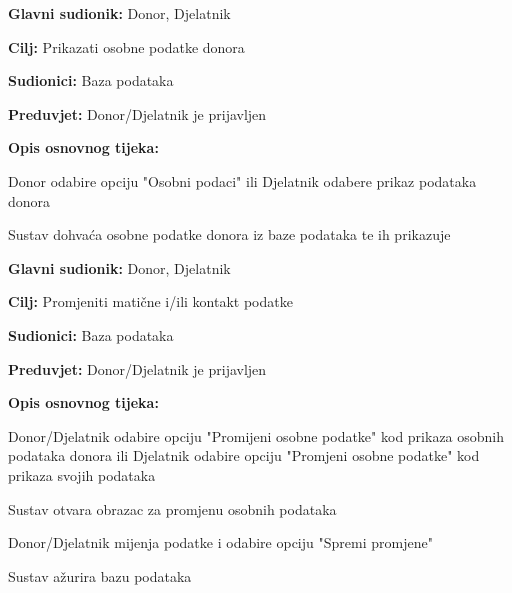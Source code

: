 \noindent {}
					\begin{packed_item}
	
						\item \textbf{Glavni sudionik: }Donor, Djelatnik
						\item \textbf{Cilj:} Prikazati osobne podatke donora
						\item \textbf{Sudionici:} Baza podataka
						\item \textbf{Preduvjet:} Donor/Djelatnik je prijavljen
						\item \textbf{Opis osnovnog tijeka:}
						
						\item[] \begin{packed_enum}
	
							\item Donor odabire opciju "Osobni podaci" ili Djelatnik odabere prikaz podataka donora
							\item Sustav dohvaća osobne podatke donora iz baze podataka te ih prikazuje
							
						\end{packed_enum}

					\end{packed_item}
\eject 
\noindent {}
					\begin{packed_item}
	
						\item \textbf{Glavni sudionik: }Donor, Djelatnik
						\item \textbf{Cilj:} Promjeniti matične i/ili kontakt podatke
						\item \textbf{Sudionici:} Baza podataka
						\item \textbf{Preduvjet:} Donor/Djelatnik je prijavljen
						\item \textbf{Opis osnovnog tijeka:}
						
						\item[] \begin{packed_enum}
	
							\item Donor/Djelatnik odabire opciju "Promijeni osobne podatke" kod prikaza osobnih podataka donora ili Djelatnik odabire opciju "Promjeni osobne podatke" kod prikaza svojih podataka
							\item Sustav otvara obrazac za promjenu osobnih podataka
							\item Donor/Djelatnik mijenja podatke i odabire opciju "Spremi promjene"
							
							\item Sustav ažurira bazu podataka
							
						\end{packed_enum}
					\end{packed_item}
